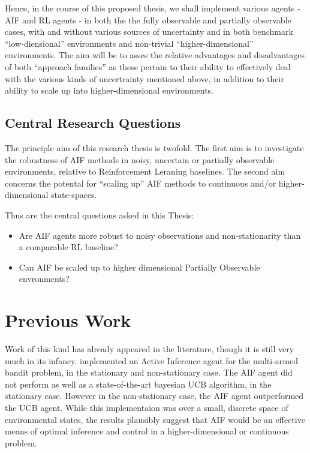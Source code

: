 \documentclass[12pt, twoside]{report}
\begin{document}
Hence, in the course of this proposed thesis, we shall implement various agents - AIF and RL agents - in both the the fully observable and partially observable cases, with and without various sources of uncertainty and in both benchmark ``low-diensional'' environments and  non-trivial ``higher-dimensional'' environments. The aim will be to asses the relative advantages and disadvantages of both ``approach families'' as these pertain to their ability to effectively deal with the various kinds of uncertrainty mentioned above, in addition to their ability to scale up into higher-dimensional environments.     


\subsection{Central Research Questions}
The principle aim of this research thesis is twofold. The first aim is to investigate the robustness of AIF methods in noisy, uncertain or partially observable environments, relative to Reinforcement Leraning baselines. The second aim concerns the potental for ``scaling up'' AIF methods to continuous and/or higher-dimensional state-spaces. 

Thus are the central questions asked in this Thesis:

\begin{itemize}
\item Are AIF agents more robust to noisy observations and non-stationarity than a comparable RL baseline?
\item Can AIF be scaled up to higher dimensional Partially Observable envronments? 
\end{itemize} 



\section{Previous Work}
Work of this kind has already appeared in the literature, though it is still very much in its infancy. \textcite{Markovi-2021} implemented an Active Inference agent for the multi-armed bandit problem, in the stationary and non-stationary case. The AIF agent did not perform as well as a state-of-the-art bayesian UCB algorithm, in the stationary case. However in the non-stationary case, the AIF agent outperformed the UCB agent. While this implementaion was over a small, discrete space of environmental states, the results plausibly suggest that AIF would be an effective means of optimal inference and control in a higher-dimensional or continuous problem.  
\end{document}
